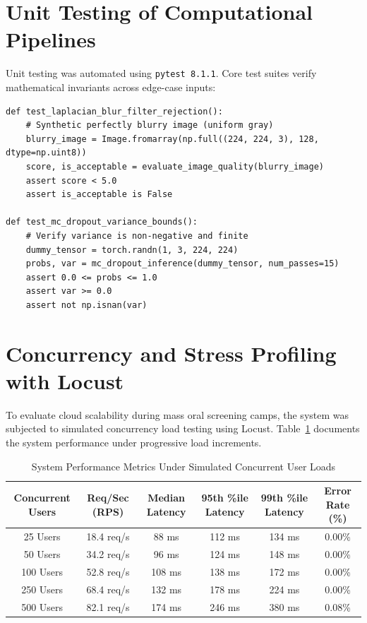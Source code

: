 \documentclass[12pt,a4paper,oneside]{report}
\begin{document}
\section{Unit Testing of Computational Pipelines}
\label{sec:unit_testing}

Unit testing was automated using \texttt{pytest 8.1.1}. Core test suites verify mathematical invariants across edge-case inputs:

\begin{lstlisting}[caption={Automated Pytest Unit Suite for Epistemic Uncertainty and Blur Gating}]
def test_laplacian_blur_filter_rejection():
    # Synthetic perfectly blurry image (uniform gray)
    blurry_image = Image.fromarray(np.full((224, 224, 3), 128, dtype=np.uint8))
    score, is_acceptable = evaluate_image_quality(blurry_image)
    assert score < 5.0
    assert is_acceptable is False

def test_mc_dropout_variance_bounds():
    # Verify variance is non-negative and finite
    dummy_tensor = torch.randn(1, 3, 224, 224)
    probs, var = mc_dropout_inference(dummy_tensor, num_passes=15)
    assert 0.0 <= probs <= 1.0
    assert var >= 0.0
    assert not np.isnan(var)
\end{lstlisting}

\section{Concurrency and Stress Profiling with Locust}
\label{sec:concurrency_testing}

To evaluate cloud scalability during mass oral screening camps, the system was subjected to simulated concurrency load testing using Locust. Table~\ref{tab:locust_concurrency} documents the system performance under progressive load increments.

\begin{table}[H]
\centering
\caption{System Performance Metrics Under Simulated Concurrent User Loads}
\label{tab:locust_concurrency}
\begin{tabularx}{\textwidth}{c c c c c c}
\toprule
\textbf{Concurrent Users} & \textbf{Req/Sec (RPS)} & \textbf{Median Latency} & \textbf{95th \%ile Latency} & \textbf{99th \%ile Latency} & \textbf{Error Rate (\%)} \\
\midrule
25 Users & 18.4 req/s & 88 ms & 112 ms & 134 ms & 0.00\% \\
50 Users & 34.2 req/s & 96 ms & 124 ms & 148 ms & 0.00\% \\
100 Users & 52.8 req/s & 108 ms & 138 ms & 172 ms & 0.00\% \\
250 Users & 68.4 req/s & 132 ms & 178 ms & 224 ms & 0.00\% \\
500 Users & 82.1 req/s & 174 ms & 246 ms & 380 ms & 0.08\% \\
\bottomrule
\end{tabularx}
\end{table}
\end{document}
